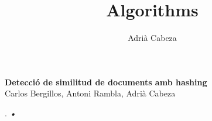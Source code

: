 \documentclass[12pt]{article}
\author{Adrià Cabeza}
\title{Algorithms}
\begin{document}
\vspace{0.5cm}

\begin{titlepage}
   \begin{center}
      \Large\textbf{Detecció de similitud de documents amb hashing }\\
      Carlos Bergillos, Antoni Rambla, Adrià Cabeza
   \end{center}
\end{titlepage}


\newpage.
\textsl{•}
\end{document}
